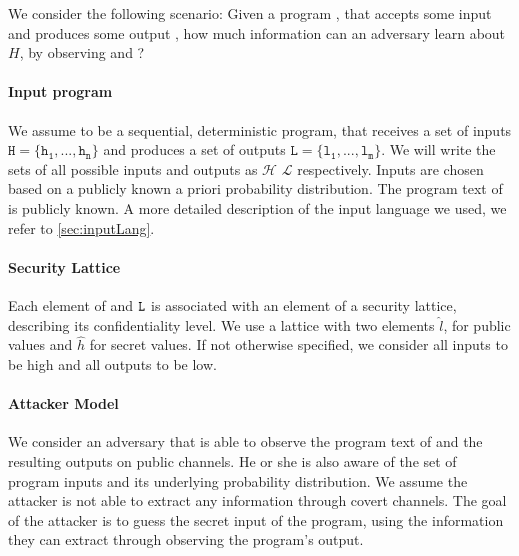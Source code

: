 We consider the following scenario: Given a program \p, that accepts some input \In and produces some output \Out, how much information can an adversary \A learn about $H$, by observing \p and \Out?

\paragraph{Input program} We assume \p to be a sequential, deterministic program, that receives a set of inputs $\mathtt{H = \{h_1, ..., h_n\}}$ and produces a set of outputs $\mathtt{L = \{l_1, ..., l_m\}}$. We will write the sets of all possible inputs and outputs as $\mathcal{H}$ $\mathcal{L}$ respectively. Inputs are chosen based on a publicly known a priori probability distribution. The program text of \p is publicly known. A more detailed description of the input language we used, we refer to \ref{sec:inputLang}.

\paragraph{Security Lattice} Each element of \In and $\mathtt{L}$ is associated with an element of a security lattice, describing its confidentiality level. We use a lattice with two elements $\hat{l}$, for public values and $\hat{h}$ for secret values. If not otherwise specified, we consider all inputs to be high and all outputs to be low.

\paragraph{Attacker Model} We consider an adversary \A that is able to observe the program text of \p and the resulting outputs on public channels. He or she is also aware of the set of program inputs and its underlying probability distribution. We assume the attacker is not able to extract any information through covert channels. The goal of the attacker is to guess the secret input of the program, using the information they can extract through observing the program's output.



